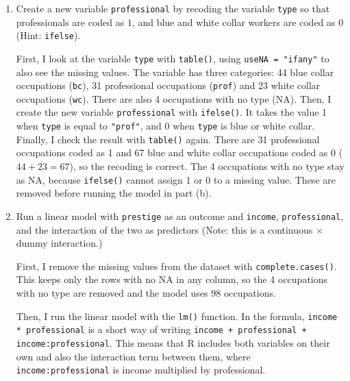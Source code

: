 \documentclass[12pt,letterpaper]{article}
\begin{document}
\newpage
\begin{enumerate}
	
	\item [(a)]
	Create a new variable \texttt{professional} by recoding the variable \texttt{type} so that professionals are coded as $1$, and blue and white collar workers are coded as $0$ (Hint: \texttt{ifelse}).
	
	\noindent First, I look at the variable \texttt{type} with \texttt{table()}, using \texttt{useNA = "ifany"} to also see the missing values. The variable has three categories: 44 blue collar occupations (\texttt{bc}), 31 professional occupations (\texttt{prof}) and 23 white collar occupations (\texttt{wc}). There are also 4 occupations with no type (NA). Then, I create the new variable \texttt{professional} with \texttt{ifelse()}. It takes the value 1 when \texttt{type} is equal to \texttt{"prof"}, and 0 when \texttt{type} is blue or white collar. Finally, I check the result with \texttt{table()} again. There are 31 professional occupations coded as 1 and 67 blue and white collar occupations coded as 0 ($44 + 23 = 67$), so the recoding is correct. The 4 occupations with no type stay as NA, because \texttt{ifelse()} cannot assign 1 or 0 to a missing value. These are removed before running the model in part (b).
	
	
	
	\vspace{1cm}
	
	
	\item [(b)]
	Run a linear model with \texttt{prestige} as an outcome and \texttt{income}, \texttt{professional}, and the interaction of the two as predictors (Note: this is a continuous $\times$ dummy interaction.)
	
	\noindent First, I remove the missing values from the dataset with \texttt{complete.cases()}. This keeps only the rows with no NA in any column, so the 4 occupations with no type are removed and the model uses 98 occupations.
	
	
	
	\noindent Then, I run the linear model with the \texttt{lm()} function. In the formula, \texttt{income * professional} is a short way of writing \texttt{income + professional + income:professional}. This means that R includes both variables on their own and also the interaction term between them, where \texttt{income:professional} is income multiplied by professional.
	

\end{enumerate}
\end{document}
